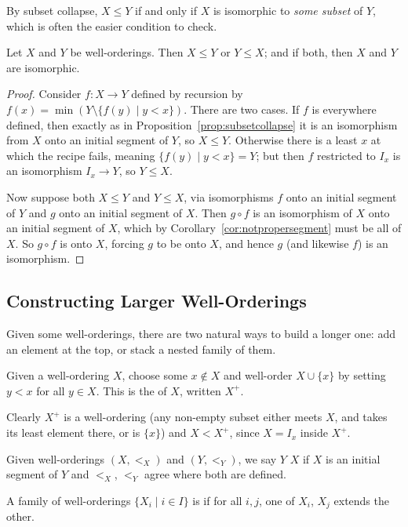 \documentclass[a4paper]{scrartcl}
\begin{document}
By subset collapse, $X \leq Y$ if and only if $X$ is isomorphic to \emph{some subset} of $Y$, which is often the easier condition to check.

\begin{proposition}\label{prop:wotrichotomy}
  Let $X$ and $Y$ be well-orderings. Then $X \leq Y$ or $Y \leq X$; and if both, then $X$ and $Y$ are isomorphic.
\end{proposition}
\begin{proof}
  Consider $f: X \rightarrow Y$ defined by recursion by $f(x) = \min (Y \setminus \{f(y) \mid y < x\})$. There are two cases. If $f$ is everywhere defined, then exactly as in Proposition~\ref{prop:subsetcollapse} it is an isomorphism from $X$ onto an initial segment of $Y$, so $X \leq Y$. Otherwise there is a least $x$ at which the recipe fails, meaning $\{f(y) \mid y < x\} = Y$; but then $f$ restricted to $I_x$ is an isomorphism $I_x \to Y$, so $Y \leq X$.

  Now suppose both $X \leq Y$ and $Y \leq X$, via isomorphisms $f$ onto an initial segment of $Y$ and $g$ onto an initial segment of $X$. Then $g \circ f$ is an isomorphism of $X$ onto an initial segment of $X$, which by Corollary~\ref{cor:notpropersegment} must be all of $X$. So $g \circ f$ is onto $X$, forcing $g$ to be onto $X$, and hence $g$ (and likewise $f$) is an isomorphism.
\end{proof}

\subsection{Constructing Larger Well-Orderings}

Given some well-orderings, there are two natural ways to build a longer one: add an element at the top, or stack a nested family of them.

\begin{definition}[Successor]
  Given a well-ordering $X$, choose some $x \notin X$ and well-order $X \cup \{x\}$ by setting $y < x$ for all $y \in X$. This is the  of $X$, written $X^+$.
\end{definition}

Clearly $X^+$ is a well-ordering (any non-empty subset either meets $X$, and takes its least element there, or is $\{x\}$) and $X < X^+$, since $X = I_x$ inside $X^+$.

\begin{definition}
  Given well-orderings $(X, <_X)$ and $(Y, <_Y)$, we say $Y$  $X$ if $X$ is an initial segment of $Y$ and $<_X$, $<_Y$ agree where both are defined.

  A family of well-orderings $\{X_i \mid i \in I\}$ is  if for all $i, j$, one of $X_i$, $X_j$ extends the other.
\end{definition}
\end{document}
